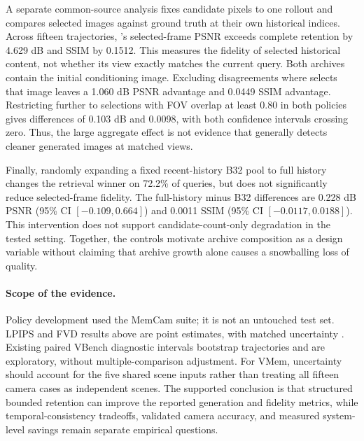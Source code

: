 A separate common-source analysis fixes candidate pixels to one rollout and
compares selected images against ground truth at their own historical indices.
Across fifteen trajectories, \Geo's selected-frame PSNR exceeds complete
retention by 4.629 dB and SSIM by 0.1512. This measures the fidelity of selected
historical content, not whether its view exactly matches the current query.
Both archives contain the initial conditioning image. Excluding disagreements
where \Geo selects that image leaves a 1.060 dB PSNR advantage and 0.0449
SSIM advantage. Restricting further to selections with FOV overlap at least
0.80 in both policies gives differences of 0.103 dB and 0.0098, with both
confidence intervals crossing zero. Thus, the large aggregate effect is not
evidence that \Geo generally detects cleaner generated images at matched views.

Finally, randomly expanding a fixed recent-history B32 pool to full history
changes the retrieval winner on 72.2\% of queries, but does not significantly
reduce selected-frame fidelity. The full-history minus B32 differences are
0.228 dB PSNR (95\% CI $[-0.109,0.664]$) and 0.0011 SSIM
(95\% CI $[-0.0117,0.0188]$). This intervention does not support
candidate-count-only degradation in the tested setting. Together, the
controls motivate archive composition as a design variable without claiming
that archive growth alone causes a snowballing loss of quality.

\paragraph{Scope of the evidence.}
Policy development used the MemCam suite; it is not an untouched test set.
LPIPS and FVD results above are point estimates, with matched uncertainty
\TBD. Existing paired VBench diagnostic intervals bootstrap trajectories
and are exploratory, without multiple-comparison adjustment. For VMem,
uncertainty should account for the five shared scene inputs rather than
treating all fifteen camera cases as independent scenes. The supported
conclusion is that structured bounded retention can improve the reported
generation and fidelity metrics, while temporal-consistency tradeoffs,
validated camera accuracy, and measured system-level savings remain
separate empirical questions.
